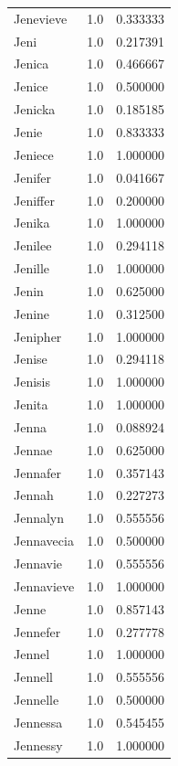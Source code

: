 \documentclass[
  letterpaper,
  DIV=11,
  numbers=noendperiod]{scrreprt}
\begin{document}
\begin{tabular}{lrr}
Jenevieve       &   1.0 &   0.333333 \\
Jeni            &   1.0 &   0.217391 \\
Jenica          &   1.0 &   0.466667 \\
Jenice          &   1.0 &   0.500000 \\
Jenicka         &   1.0 &   0.185185 \\
Jenie           &   1.0 &   0.833333 \\
Jeniece         &   1.0 &   1.000000 \\
Jenifer         &   1.0 &   0.041667 \\
Jeniffer        &   1.0 &   0.200000 \\
Jenika          &   1.0 &   1.000000 \\
Jenilee         &   1.0 &   0.294118 \\
Jenille         &   1.0 &   1.000000 \\
Jenin           &   1.0 &   0.625000 \\
Jenine          &   1.0 &   0.312500 \\
Jenipher        &   1.0 &   1.000000 \\
Jenise          &   1.0 &   0.294118 \\
Jenisis         &   1.0 &   1.000000 \\
Jenita          &   1.0 &   1.000000 \\
Jenna           &   1.0 &   0.088924 \\
Jennae          &   1.0 &   0.625000 \\
Jennafer        &   1.0 &   0.357143 \\
Jennah          &   1.0 &   0.227273 \\
Jennalyn        &   1.0 &   0.555556 \\
Jennavecia      &   1.0 &   0.500000 \\
Jennavie        &   1.0 &   0.555556 \\
Jennavieve      &   1.0 &   1.000000 \\
Jenne           &   1.0 &   0.857143 \\
Jennefer        &   1.0 &   0.277778 \\
Jennel          &   1.0 &   1.000000 \\
Jennell         &   1.0 &   0.555556 \\
Jennelle        &   1.0 &   0.500000 \\
Jennessa        &   1.0 &   0.545455 \\
Jennessy        &   1.0 &   1.000000 \\

\end{tabular}
\end{document}
